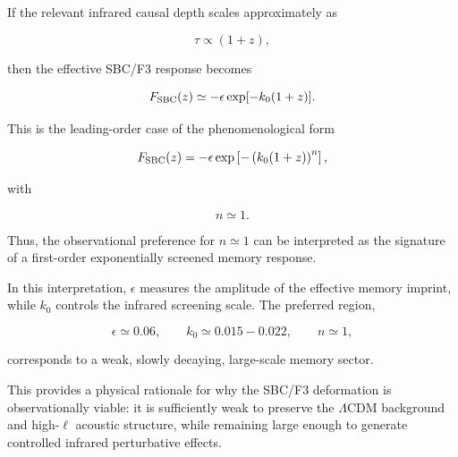 If the relevant infrared causal depth scales approximately as

\begin{equation}
\tau \propto (1+z),
\end{equation}

then the effective SBC/F3 response becomes

\begin{equation}
F_{\rm SBC}(z)
\simeq
-\epsilon \exp[-k_0(1+z)].
\end{equation}

This is the leading-order case of the phenomenological form

\begin{equation}
F_{\rm SBC}(z)
=
-\epsilon
\exp\left[-\left(k_0(1+z)\right)^n\right],
\end{equation}

with

\begin{equation}
n\simeq 1.
\end{equation}

Thus, the observational preference for \(n\simeq 1\) can be interpreted as the signature of a first-order exponentially screened memory response.

In this interpretation, \(\epsilon\) measures the amplitude of the effective memory imprint, while \(k_0\) controls the infrared screening scale. The preferred region,

\begin{equation}
\epsilon\simeq 0.06,
\qquad
k_0\simeq 0.015-0.022,
\qquad
n\simeq 1,
\end{equation}

corresponds to a weak, slowly decaying, large-scale memory sector.

This provides a physical rationale for why the SBC/F3 deformation is observationally viable: it is sufficiently weak to preserve the \(\Lambda\)CDM background and high-\(\ell\) acoustic structure, while remaining large enough to generate controlled infrared perturbative effects.

